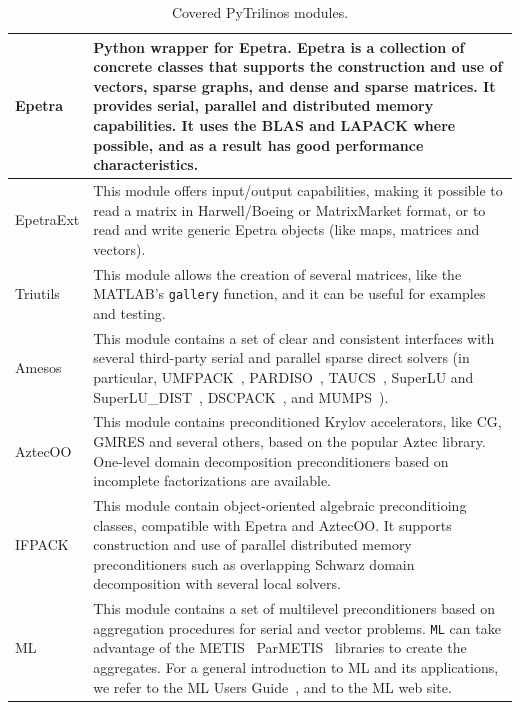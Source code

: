 \documentclass[10pt,relax]{SANDreport}
\begin{document}
\begin{table}
\begin{center}
\begin{tabular}{| p{2cm} | p{12cm} |}
\hline
Epetra &  Python wrapper for Epetra. Epetra is a collection
of concrete classes that supports the construction and use of vectors, sparse
graphs, and dense and sparse matrices. It provides serial, parallel and
distributed memory capabilities. It uses the BLAS and LAPACK where possible,
  and as a result has good performance characteristics. \\
  \hline
%
EpetraExt & This module offers input/output
capabilities, making it possible to read a matrix in Harwell/Boeing or
MatrixMarket format, or to read and write generic Epetra objects 
(like maps, matrices and vectors). \\
  \hline
%
Triutils & This module allows the creation of several matrices, 
  like the MATLAB's {\tt gallery} function, and it can be useful for examples
  and testing. \\
  \hline
%
Amesos & This module contains a set of clear and consistent
interfaces with several third-party serial and parallel sparse direct solvers
(in particular,
UMFPACK~\cite{umfpack-manual},
PARDISO~\cite{pardiso-manual},
TAUCS~\cite{taucs-manual},
SuperLU and SuperLU\_DIST~\cite{superlu-manual},
DSCPACK~\cite{dscpack-manual}, and 
MUMPS~\cite{mumps-manual}). \\
  \hline
%
AztecOO & This module contains preconditioned Krylov accelerators,
like CG, GMRES and several others, based on the popular Aztec library.
One-level domain decomposition preconditioners based on incomplete
factorizations are available. \\
\hline
%
IFPACK & This module contain object-oriented algebraic preconditioing
classes, compatible with Epetra and AztecOO.
It supports construction and use of parallel distributed memory preconditioners
such as overlapping Schwarz domain decomposition with several local solvers. 
\\
\hline
%
ML & This module contains a set of multilevel preconditioners based
on aggregation procedures for serial and vector problems. {\tt ML} can take
advantage of the 
METIS~\cite{metis}
ParMETIS~\cite{parmetis} libraries to create the aggregates.
For a general introduction to ML and its applications, we refer to
the ML Users Guide~\cite{ml-guide}, and to the ML web site. \\
\hline
\end{tabular}
\caption{Covered PyTrilinos modules.}
\label{tab:modules}
\end{center}
\end{table}
\end{document}
